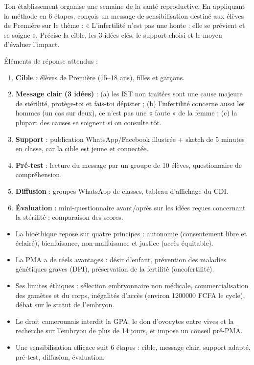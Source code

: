 \documentclass[11pt]{article}
\newcommand{\cle}[1]{{\popxbold\color{popdark}#1}}
\begin{document}
\begin{exercice}
Ton établissement organise une semaine de la santé reproductive. En appliquant la méthode en 6 étapes, conçois un message de sensibilisation destiné aux élèves de Première sur le thème : « L'infertilité n'est pas une honte : elle se prévient et se soigne ». Précise la cible, les 3 idées clés, le support choisi et le moyen d'évaluer l'impact.
\end{exercice}

\begin{corrige}[Exercice]
Éléments de réponse attendus :
\begin{enumerate}
\item \textbf{Cible} : élèves de Première (15--18 ans), filles et garçons.
\item \textbf{Message clair (3 idées)} : (a) les IST non traitées sont une cause majeure de stérilité, protège-toi et fais-toi dépister ; (b) l'infertilité concerne aussi les hommes (un cas sur deux), ce n'est pas une « faute » de la femme ; (c) la plupart des causes se soignent si on consulte tôt.
\item \textbf{Support} : publication WhatsApp/Facebook illustrée + sketch de 5 minutes en classe, car la cible est jeune et connectée.
\item \textbf{Pré-test} : lecture du message par un groupe de 10 élèves, questionnaire de compréhension.
\item \textbf{Diffusion} : groupes WhatsApp de classes, tableau d'affichage du CDI.
\item \textbf{Évaluation} : mini-questionnaire avant/après sur les idées reçues concernant la stérilité ; comparaison des scores.
\end{enumerate}
\end{corrige}

\begin{aretenir}
\begin{itemize}
\item La bioéthique repose sur quatre principes : \cle{autonomie} (consentement libre et éclairé), \cle{bienfaisance}, \cle{non-malfaisance} et \cle{justice} (accès équitable).
\item La PMA a de réels avantages : désir d'enfant, prévention des maladies génétiques graves (DPI), préservation de la fertilité (oncofertilité).
\item Ses limites éthiques : sélection embryonnaire non médicale, commercialisation des gamètes et du corps, inégalités d'accès (environ \num{1200000} FCFA le cycle), débat sur le statut de l'embryon.
\item Le droit camerounais interdit la GPA, le don d'ovocytes entre vives et la recherche sur l'embryon de plus de 14 jours, et impose un conseil pré-PMA.
\item Une sensibilisation efficace suit 6 étapes : cible, message clair, support adapté, pré-test, diffusion, évaluation.
\end{itemize}
\end{aretenir}
\end{document}
